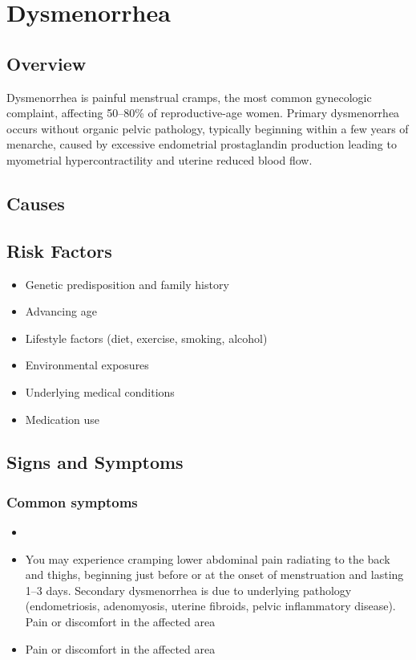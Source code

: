 \chapter{Dysmenorrhea}
\label{sec:Dysmenorrhea}

\section{Overview}
Dysmenorrhea is painful menstrual cramps, the most common gynecologic complaint, affecting 50--80\% of reproductive-age women. Primary dysmenorrhea occurs without organic pelvic pathology, typically beginning within a few years of menarche, caused by excessive endometrial prostaglandin production leading to myometrial hypercontractility and uterine reduced blood flow.
\section{Causes}
\section{Risk Factors}

\begin{itemize}[noitemsep]
  \item Genetic predisposition and family history
  \item Advancing age
  \item Lifestyle factors (diet, exercise, smoking, alcohol)
  \item Environmental exposures
  \item Underlying medical conditions
  \item Medication use
\end{itemize}
\section{Signs and Symptoms}

\subsection{Common symptoms}
\begin{itemize}[noitemsep]
  \item \item You may experience cramping lower abdominal pain radiating to the back and thighs, beginning just before or at the onset of menstruation and lasting 1--3 days. Secondary dysmenorrhea is due to underlying pathology (endometriosis, adenomyosis, uterine fibroids, pelvic inflammatory disease). Pain or discomfort in the affected area    \item Pain or discomfort in the affected area
  \end{itemize}

